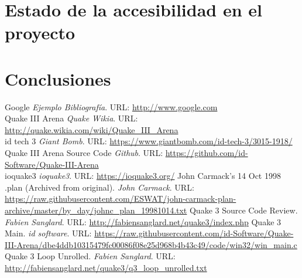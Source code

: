 \documentclass[a4paper,12pt]{report}
\begin{document}
	\section{Estado de la accesibilidad en el proyecto}
	
	\section{Conclusiones}
			
	
	
	
	\begin{appendices}
	\end{appendices}
	
	\begin{thebibliography}{9}
		
		Google \emph{Ejemplo Bibliografía}. URL: \url{http://www.google.com}\\
		Quake III Arena \emph{Quake Wikia}. URL: \url{http://quake.wikia.com/wiki/Quake_III_Arena}\\
		 id tech 3 \emph{Giant Bomb}. URL: \url{https://www.giantbomb.com/id-tech-3/3015-1918/}\\
		 Quake III Arena Source Code \emph{Github}. URL: \url{https://github.com/id-Software/Quake-III-Arena}\\
		 ioquake3 \emph{ioquake3}. URL: \url{https://ioquake3.org/}
         John Carmack's 14 Oct 1998 .plan (Archived from original). \emph{John Carmack}. URL: \url{https://raw.githubusercontent.com/ESWAT/john-carmack-plan-archive/master/by_day/johnc_plan_19981014.txt}
		 Quake 3 Source Code Review. \emph{Fabien Sanglard}. URL: \url{http://fabiensanglard.net/quake3/index.php}
		 Quake 3 Main. \emph{id software}. URL: \url{https://raw.githubusercontent.com/id-Software/Quake-III-Arena/dbe4ddb10315479fc00086f08e25d968b4b43c49/code/win32/win_main.c}
         Quake 3 Loop Unrolled. \emph{Fabien Sanglard}. URL: \url{http://fabiensanglard.net/quake3/q3_loop_unrolled.txt}
		
	\end{thebibliography}


	
	
\end{document}
